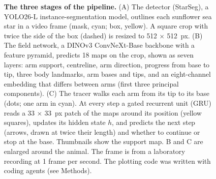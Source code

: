 \begin{figure}[!ht]
\caption{{\bf The three stages of the pipeline.}
(A) The detector (StarSeg), a YOLO26-L instance-segmentation model, outlines each sunflower sea star in a video frame (mask, cyan; box, yellow). A square crop with twice the side of the box (dashed) is resized to 512 $\times$ 512~px.
(B) The field network, a DINOv3 ConvNeXt-Base backbone with a feature pyramid, predicts 18 maps on the crop, shown as seven layers: arm support, centreline, arm direction, progress from base to tip, three body landmarks, arm bases and tips, and an eight-channel embedding that differs between arms (first three principal components).
(C) The tracer walks each arm from its tip to its base (dots; one arm in cyan). At every step a gated recurrent unit (GRU) reads a 33 $\times$ 33~px patch of the maps around its position (yellow squares), updates its hidden state $h$, and predicts the next step (arrows, drawn at twice their length) and whether to continue or stop at the base. Thumbnails show the support map. B and C are enlarged around the animal. The frame is from a laboratory recording at 1 frame per second. The plotting code was written with coding agents (see Methods).}
\label{fig:workflow}
\end{figure}
